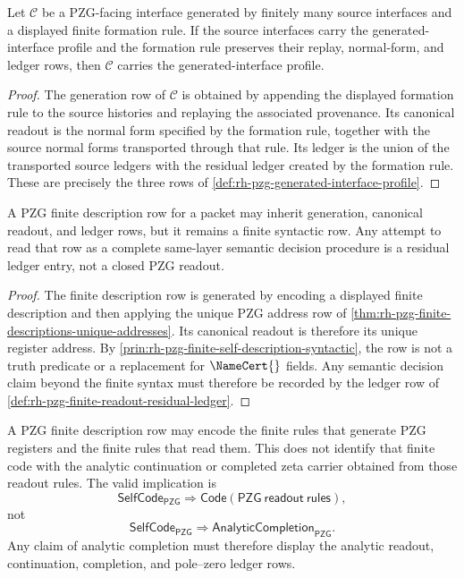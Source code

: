 \begin{theorem}
\label{thm:rh-pzg-generated-concepts-inherit-profile}
Let $\mathcal C$ be a PZG-facing interface generated by finitely many
source interfaces and a displayed finite formation rule.  If the source
interfaces carry the generated-interface profile and the formation rule
preserves their replay, normal-form, and ledger rows, then $\mathcal C$
carries the generated-interface profile.
\end{theorem}

\begin{proof}
The generation row of $\mathcal C$ is obtained by appending the displayed
formation rule to the source histories and replaying the associated
provenance.  Its canonical readout is the normal form specified by the
formation rule, together with the source normal forms transported through
that rule.  Its ledger is the union of the transported source ledgers with
the residual ledger created by the formation rule.  These are precisely the
three rows of \autoref{def:rh-pzg-generated-interface-profile}.
\end{proof}

\begin{corollary}
\label{cor:rh-pzg-self-description-keeps-profile-boundary}
A PZG finite description row for a packet may inherit generation, canonical
readout, and ledger rows, but it remains a finite syntactic row.  Any attempt
to read that row as a complete same-layer semantic decision procedure is a
residual ledger entry, not a closed PZG readout.
\end{corollary}

\begin{proof}
The finite description row is generated by encoding a displayed finite
description and then applying the unique PZG address row of
\autoref{thm:rh-pzg-finite-descriptions-unique-addresses}.  Its canonical
readout is therefore its unique register address.  By
\autoref{prin:rh-pzg-finite-self-description-syntactic}, the row is not a
truth predicate or a replacement for $\NameCert{}$ fields.  Any semantic
decision claim beyond the finite syntax must therefore be recorded by the
ledger row of
\autoref{def:rh-pzg-finite-readout-residual-ledger}.
\end{proof}

\begin{principle}
\label{prin:rh-pzg-self-code-not-analytic-completion}
A PZG finite description row may encode the finite rules that generate PZG
registers and the finite rules that read them.  This does not identify that
finite code with the analytic continuation or completed zeta carrier obtained
from those readout rules.  The valid implication is
$$
\mathsf{SelfCode}_{\mathsf{PZG}}
\Longrightarrow
\mathsf{Code}(\mathsf{PZG\ readout\ rules}),
$$
not
$$
\mathsf{SelfCode}_{\mathsf{PZG}}
\Longrightarrow
\mathsf{AnalyticCompletion}_{\mathsf{PZG}}.
$$
Any claim of analytic completion must therefore display the analytic readout,
continuation, completion, and pole--zero ledger rows.
\end{principle}


